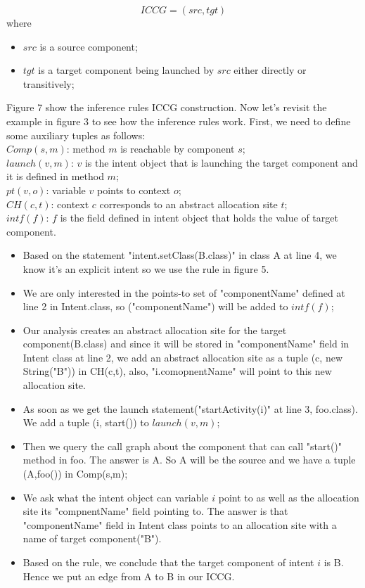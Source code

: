 \documentclass{sig-alternate}
\begin{document}
\[ICCG=(src, tgt)\]
where 
\begin{itemize}
  \item $src$ is a source component; 
  \item $tgt$ is a target component being launched by $src$ either directly or transitively;
\end{itemize}
Figure 7 show the inference rules ICCG construction.
Now let's revisit the example in figure 3 to see how the inference rules work.  
First, we need to define some auxiliary tuples as follows: \\
$Comp(s,m)$: method $m$ is reachable by component $s$; \\
$launch(v,m)$: $v$ is the intent object that is launching the target component and it is defined in method $m$; \\
$pt(v, o)$: variable $v$ points to context $o$;\\
$CH(c, t)$: context $c$ corresponds to an abstract allocation site $t$;\\
$intf(f)$: $f$ is the field defined in intent object that holds the value of target component.\\
\begin{itemize}
  \item Based on the statement "intent.setClass(B.class)" in class A at line 4, we know it's an explicit intent so we use the rule in figure 5. 
   \item We are only interested in the points-to set of "componentName" defined at line 2 in Intent.class, so ("componentName") will be added to $intf(f)$;
  \item Our analysis  creates an abstract allocation site for the target component(B.class) and since it will be stored in "componentName" field in Intent class at line 2, we add an abstract allocation site as a tuple (c, new String("B")) in CH(c,t), also, "i.comopnentName" will point to this new allocation site.
  \item  As soon as we get the launch statement("startActivity(i)" at line 3, foo.class). We add a tuple (i, start()) to $launch(v,m)$;
  \item Then we query the call graph about the component that can call "start()" method in foo. The answer is A. So A will be the source and we have a tuple (A,foo()) in Comp(s,m);
 \item We ask what the intent object can variable $i$ point to as well as the allocation site its "compnentName"  field pointing to. The answer is that "componentName" field in Intent class points to an allocation site with a name of target component("B"). 
 \item Based on the rule, we conclude that the target component of intent $i$ is B. Hence we put an edge from A to B in our ICCG.
\end{itemize}
\end{document}
